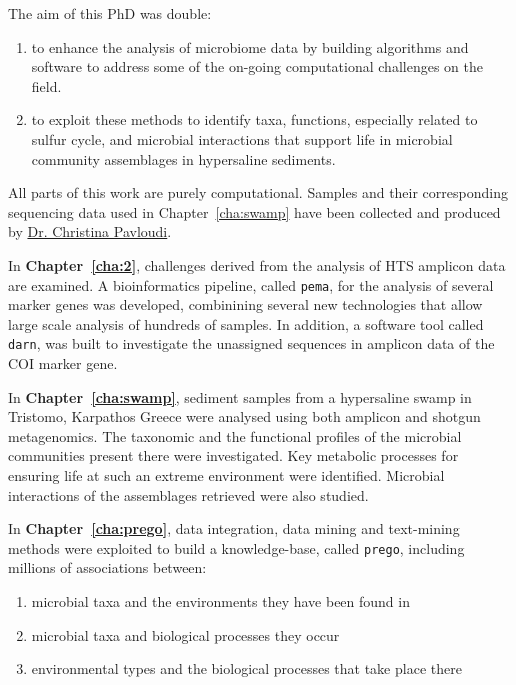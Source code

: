    The aim of this PhD was double:
   \begin{enumerate}
      \item to enhance the analysis of microbiome data by building algorithms and software 
            to address some of the on-going computational challenges on the field.
      \item to exploit these methods to identify taxa, functions, especially related to sulfur cycle, 
            and microbial interactions that support life in microbial community assemblages in hypersaline sediments.
   \end{enumerate}
   All parts of this work are purely computational. 
   Samples and their corresponding sequencing data used in Chapter~\ref{cha:swamp} have been collected 
   and produced by \href{https://scholar.google.com/citations?user=3zs1rNkAAAAJ&hl=en&oi=sra}{Dr. Christina Pavloudi}. 

   In \textbf{Chapter~\ref{cha:2}}, challenges derived from the analysis of HTS amplicon data are examined.
   A bioinformatics pipeline, called \texttt{pema}, for the analysis of several marker genes was developed, combinining several new technologies that allow large scale analysis of hundreds of samples. 
   In addition, a software tool called \texttt{darn}, was built to investigate the unassigned sequences in amplicon data of the COI marker gene. 

   In \textbf{Chapter~\ref{cha:swamp}}, sediment samples from a hypersaline swamp in Tristomo, Karpathos Greece were analysed using both amplicon and shotgun metagenomics. 
   The taxonomic and the functional profiles of the microbial communities present there were investigated. 
   Key metabolic processes for ensuring life at such an extreme environment were identified.
   Microbial interactions of the assemblages retrieved were also studied. 

   In \textbf{Chapter~\ref{cha:prego}}, data integration, data mining and text-mining methods were exploited to build a knowledge-base, called \texttt{prego}, including millions of associations between:
   \begin{enumerate}
      \item microbial taxa and the environments they have been found in 
      \item microbial taxa and biological processes they occur
      \item environmental types and the biological processes that take place there
   \end{enumerate}

